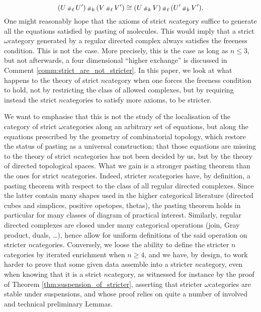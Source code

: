 \begin{equation*}
    (U \,{\scriptstyle\#}_{\ell}\, U') \,{\scriptstyle\#}_{k}\, (V \,{\scriptstyle\#}_{\ell}\, V') \cong (U \,{\scriptstyle\#}_{k}\, V) \,{\scriptstyle\#}_{\ell}\, (U' \,{\scriptstyle\#}_{k}\, V').
\end{equation*}
One might reasonably hope that the axioms of strict \( n \)\nbd category suffice to generate all the equations satisfied by pasting of molecules.
This would imply that a strict \( \omega \)\nbd category generated by a regular directed complex always satisfies the freeness condition. 
This is not the case.
More precisely, this is the case as long as \( n \le 3 \), but not afterwards, a four dimensional ``higher exchange'' is discussed in Comment \ref{comm:strict_are_not_stricter}.
In this paper, we look at what happens to the theory of strict \( n \)\nbd category when one forces the freeness condition to hold, not by restricting the class of allowed complexes, but by requiring instead the strict \( n \)\nbd categories to satisfy more axioms, to be stricter.

We want to emphasise that this is not the study of the localisation of the category of strict \( \omega \)\nbd categories along an arbitrary set of equations, but along the equations prescribed by the geometry of combinatorial topology, which restore the status of pasting as a universal construction; that those equations are missing to the theory of strict \( n \)\nbd categories has not been decided by us, but by the theory of directed topological spaces.
What we gain is a stronger pasting theorem than the ones for strict \( n \)\nbd categories.
Indeed, stricter \( n \)\nbd categories have, by definition, a pasting theorem with respect to the class of all regular directed complexes. 
Since the latter contain many shapes used in the higher categorical literature (directed cubes and simplices, positive opetopes, thetas), the pasting theorem holds in particular for many classes of diagram of practical interest.   
Similarly, regular directed complexes are closed under many categorical operations (join, Gray product, duals, \dots), hence allow for uniform definitions of the said operation on stricter \( n \)\nbd categories.
Conversely, we loose the ability to define the stricter \( n \)\nbd categories by iterated enrichment when \( n \geq 4 \), and we have, by design, to work harder to prove that some given data assemble into a stricter \( n \)\nbd category, even when knowing that it is a strict \( n \)\nbd category, as witnessed for instance by the proof of Theorem \ref{thm:suspension_of_stricter}, asserting that stricter \( \omega \)\nbd categories are stable under suspensions, and whose proof relies on quite a number of involved and technical preliminary Lemmas.  

